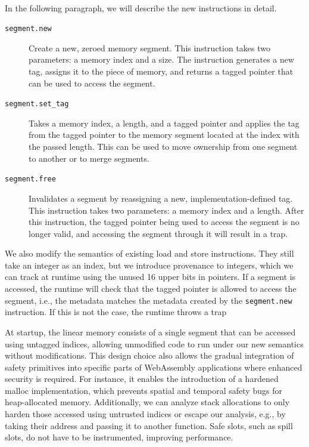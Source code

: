 \paragraph{}
In the following paragraph, we will describe the new instructions in detail.

\begin{description}
    \item[\texttt{segment.new}] Create a new, zeroed memory segment.
    This instruction takes two parameters: a memory index and a size.
    The instruction generates a new tag, assigns it to the piece of memory, and returns a tagged pointer that can be used to access the segment.
    \item[\texttt{segment.set\_tag}] Takes a memory index, a length, and a tagged pointer and applies the tag from the tagged pointer to the memory segment located at the index with the passed length.
    This can be used to move ownership from one segment to another or to merge segments.
    \item[\texttt{segment.free}] Invalidates a segment by reassigning a new, implementation-defined tag.
    This instruction takes two parameters: a memory index and a length.
    After this instruction, the tagged pointer being used to access the segment is no longer valid, and accessing the segment through it will result in a trap.
\end{description}

We also modify the semantics of existing load and store instructions.
They still take an integer as an index, but we introduce provenance to integers, which we can track at runtime using the unused 16 upper bits in pointers.
If a segment is accessed, the runtime will check that the tagged pointer is allowed to access the segment, i.e., the metadata matches the metadata created by the \texttt{segment.new} instruction.
If this is not the case, the runtime throws a trap

At startup, the linear memory consists of a single segment that can be accessed using untagged indices, allowing unmodified code to run under our new semantics without modifications.
This design choice also allows the gradual integration of safety primitives into specific parts of WebAssembly applications where enhanced security is required.
For instance, it enables the introduction of a hardened malloc implementation, which prevents spatial and temporal safety bugs for heap-allocated memory.
Additionally, we can analyze stack allocations to only harden those accessed using untrusted indices or escape our analysis, e.g., by taking their address and passing it to another function.
Safe slots, such as spill slots, do not have to be instrumented, improving performance.

